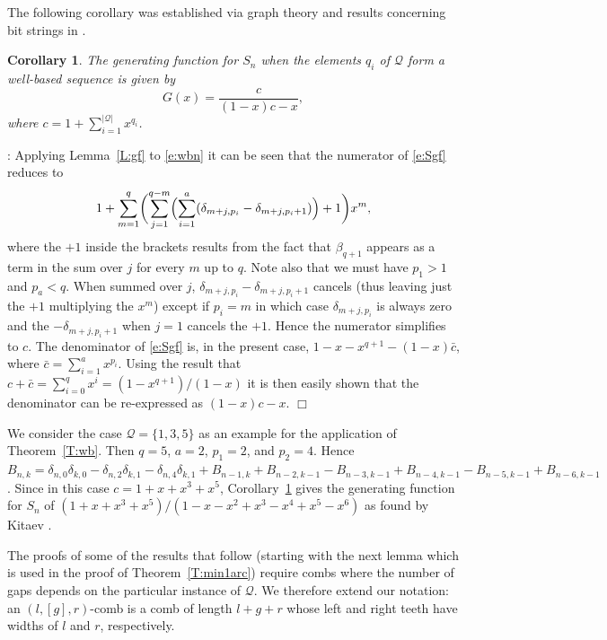 \documentclass[preprint,3p]{elsarticle}
\newtheorem{cor}{Corollary}
\newcommand{\abs}[1]{\left\lvert#1\right\rvert}
\newenvironment{proof}[1][]%
{\noindent\textit{\ifthenelse{\equal{#1}{}}{Proof}{Proof #1}}: }%
{\leavevmode\unskip\nobreak\quad\hspace*{\fill}$\Box$\par}
\begin{document}
The following corollary was established via graph theory and results concerning
bit strings in \cite{Kit06}.
\begin{cor}\label{C:wbgf}
The generating function for $S_n$ when the elements $q_i$ of
$\mathcal{Q}$ form a well-based sequence is given by
\begin{equation}\label{e:wbgf} 
G(x)=\frac{c}{(1-x)c-x},
\end{equation}
where $c=1+\sum_{i=1}^{\abs{\mathcal{Q}}}x^{q_i}$.  
\end{cor}
\begin{proof}
Applying Lemma~\ref{L:gf} to \eqref{e:wbn} it can be seen that the
numerator of \eqref{e:Sgf} reduces to
\[
1+\sum_{m=1}^q\biggl(\sum_{j=1}^{q-m}\Bigl(\sum_{i=1}^a(\delta_{m+j,p_i}-\delta_{m+j,p_i+1})\Bigr)+1\biggr)x^m,
\]
where the $+1$ inside the brackets results from the fact that
$\beta_{q+1}$ appears as a term in the sum over $j$ for every $m$ up
to $q$.  Note also that we must have $p_1>1$ and $p_a<q$.  When summed
over $j$, $\delta_{m+j,p_i}-\delta_{m+j,p_i+1}$ cancels (thus leaving
just the $+1$ multiplying the $x^m$) except if $p_i=m$ in which case
$\delta_{m+j,p_i}$ is always zero and the $-\delta_{m+j,p_i+1}$ when
$j=1$ cancels the $+1$.  Hence the numerator simplifies to $c$.  The
denominator of \eqref{e:Sgf} is, in the present case,
$1-x-x^{q+1}-(1-x)\bar{c}$, where $\bar{c}=\sum_{i=1}^ax^{p_i}$. Using
the result that $c+\bar{c}=\sum_{i=0}^qx^i=(1-x^{q+1})/(1-x)$ it is then
easily shown that the denominator can be re-expressed as $(1-x)c-x$.
\end{proof}

We consider the case $\mathcal{Q}=\{1,3,5\}$ as an example for the
application of Theorem~\ref{T:wb}. Then $q=5$, $a=2$, $p_1=2$, and
$p_2=4$. Hence
$B_{n,k}=
\delta_{n,0}\delta_{k,0}-\delta_{n,2}\delta_{k,1}-\delta_{n,4}\delta_{k,1}
+B_{n-1,k}
+B_{n-2,k-1}-B_{n-3,k-1}
+B_{n-4,k-1}-B_{n-5,k-1}
+B_{n-6,k-1}$. Since in this case $c=1+x+x^3+x^5$,
Corollary~\ref{C:wbgf} gives the generating function for $S_n$ of
$(1+x+x^3+x^5)/(1-x-x^2+x^3-x^4+x^5-x^6)$ as found by Kitaev \cite{Kit06}. 

The proofs of some of the results that follow (starting with the next
lemma which is used in the proof of Theorem~\ref{T:min1arc}) require
combs where the number of gaps depends on the particular instance of
$\mathcal{Q}$. We therefore extend our notation: an $(l,[g],r)$-comb
is a comb of length $l+g+r$ whose left and right teeth have widths of
$l$ and $r$, respectively.
\end{document}

